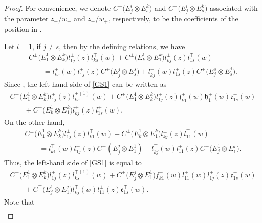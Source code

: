\documentclass[pdftex]{sigma}
\numberwithin{equation}{section}
\begin{document}
\begin{proof}





For convenience, we denote $C^+\bigl(E^i_j\otimes E^k_s\bigr)$ and $C^-\bigl(E^i_j\otimes E^k_s\bigr)$ associated with the parameter $z_+/w_-$ and $z_-/w_+$, respectively, to be the coefficients of the position  in .

Let $l=1$, if $j\neq s$, then by the defining relations, we have
\begin{gather}
 C^{\pm}\bigl(E^1_1\otimes E^k_k\bigr)l_{1j}^{\pm}(z)l_{ks}^{\mp}(w)+ C^{\pm}\bigl(E^1_k\otimes E^k_1\bigr)l_{kj}^{\pm}(z)l_{1s}^{\mp}(w) \nonumber\\ \qquad =l_{ks}^{\mp}(w)l_{1j}^{\pm}(z)C^{\mp}\bigl(E^j_j\otimes E^s_s\bigr)+l_{kj}^{\mp}(w)l_{1s}^{\pm}(z)C^{\mp}\bigl(E^s_j\otimes E^j_s\bigr).\label{GS1}
\end{gather}
Since , the left-hand side of \eqref{GS1} can be written as
\begin{gather*}
 C^{\pm}\bigl(E^1_1\otimes E^k_k\bigr)l_{1j}^{\pm}(z)l_{ks}^{\mp(1)}(w)+ C^{\pm}\bigl(E^1_1\otimes E^k_k\bigr)l_{1j}^{\pm}(z)\mathfrak{f}_{k1}^{\mp}(w)\mathfrak{h}_{1}^{\mp}(w)\mathfrak{e}_{1s}^{\mp}(w)\nonumber\\
 \qquad{}+ C^{\pm}\bigl(E^1_k\otimes E^k_1\bigr)l_{kj}^{\pm}(z)l_{1s}^{\mp}(w).
\end{gather*}On the other hand,
\begin{gather*}
 C^{\pm}\bigl(E^1_1\otimes E^k_k\bigr)l_{1j}^{\pm}(z)l_{k1}^{\mp}(w)+ C^{\pm}\bigl(E^1_k\otimes E^k_1\bigr)l_{kj}^{\pm}(z)l_{11}^{\mp}(w)\nonumber\\
\qquad = l_{k1}^{\mp}(w)l_{1j}^{\pm}(z)C^{\mp}(E^j_j\otimes E^1_1)+l_{kj}^{\mp}(w)l_{11}^{\pm}(z)C^{\mp}\bigl(E^1_j\otimes E^j_1\bigr).
\end{gather*}
Thus, the left-hand side of \eqref{GS1} is equal to
\begin{gather*}
 C^{\pm}\bigl(E^1_1\otimes E^k_k\bigr)l_{1j}^{\pm}(z)l_{ks}^{\mp(1)}(w)+ C^{\pm}\bigl(E^j_j\otimes E^1_1\bigr)f_{k1}^{\mp}(w)l_{11}^{\mp}(w)l_{1j}^{\pm}(z)\mathfrak{e}_{1s}^{\mp}(w)\\
 \qquad{}+
 C^{\mp}\bigl(E^1_j\otimes E^j_1\bigr)l_{kj}^{\mp}(w)l_{11}^{\pm}(z)\mathfrak{e}_{1s}^{\mp}(w).
\end{gather*}Note that
\begin{gather*}

\end{gather*}
\end{proof}
\end{document}
